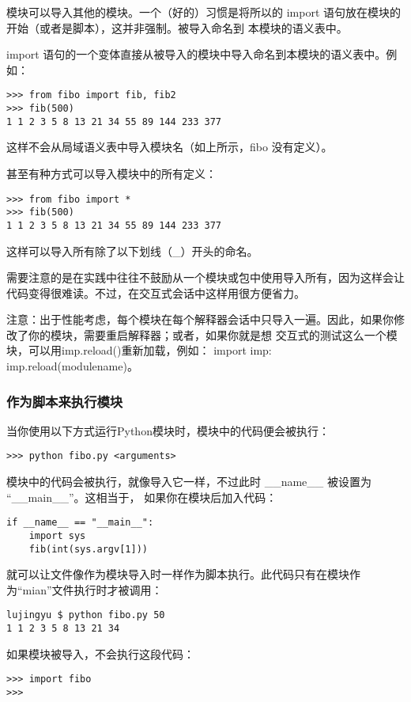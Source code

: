 \documentclass[UTF8]{ctexart}
\begin{document}
模块可以导入其他的模块。一个（好的）习惯是将所以的 import 语句放在模块的开始（或者是脚本），这并非强制。被导入命名到
本模块的语义表中。

import 语句的一个变体直接从被导入的模块中导入命名到本模块的语义表中。例如：
\begin{verbatim}
>>> from fibo import fib, fib2
>>> fib(500)
1 1 2 3 5 8 13 21 34 55 89 144 233 377
\end{verbatim}

这样不会从局域语义表中导入模块名（如上所示，fibo 没有定义）。

甚至有种方式可以导入模块中的所有定义：
\begin{verbatim}
>>> from fibo import *
>>> fib(500)
1 1 2 3 5 8 13 21 34 55 89 144 233 377
\end{verbatim}

这样可以导入所有除了以下划线（\_）开头的命名。

需要注意的是在实践中往往不鼓励从一个模块或包中使用\*导入所有，因为这样会让代码变得很难读。不过，在交互式会话中这样用很方便省力。

注意：出于性能考虑，每个模块在每个解释器会话中只导入一遍。因此，如果你修改了你的模块，需要重启解释器；或者，如果你就是想
交互式的测试这么一个模块，可以用imp.reload()重新加载，例如： import imp: imp.reload(modulename)。

\subsubsection{作为脚本来执行模块}
当你使用以下方式运行Python模块时，模块中的代码便会被执行：
\begin{verbatim}
>>> python fibo.py <arguments>
\end{verbatim}

模块中的代码会被执行，就像导入它一样，不过此时 \_\_name\_\_ 被设置为 ``\_\_main\_\_''。这相当于，
如果你在模块后加入代码：
\begin{verbatim}
if __name__ == "__main__":
    import sys
    fib(int(sys.argv[1]))
\end{verbatim}

就可以让文件像作为模块导入时一样作为脚本执行。此代码只有在模块作为``mian''文件执行时才被调用：
\begin{verbatim}
lujingyu $ python fibo.py 50
1 1 2 3 5 8 13 21 34
\end{verbatim}

如果模块被导入，不会执行这段代码：
\begin{verbatim}
>>> import fibo
>>>
\end{verbatim}
\end{document}
